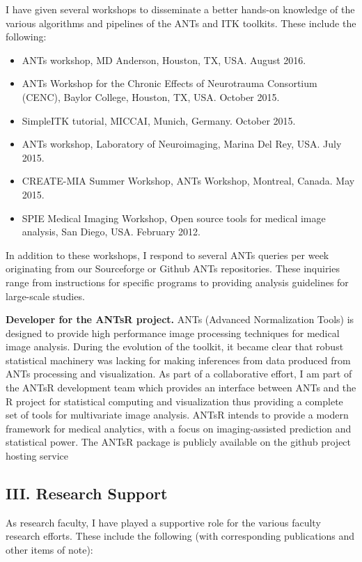 \documentclass[11pt,]{article}
\begin{document}
I have given several workshops to disseminate a better hands-on
knowledge of the various algorithms and pipelines of the ANTs and ITK
toolkits. These include the following:

\begin{itemize}
\item
  ANTs workshop, MD Anderson, Houston, TX, USA. August 2016.
\item
  ANTs Workshop for the Chronic Effects of Neurotrauma Consortium
  (CENC), Baylor College, Houston, TX, USA. October 2015.
\item
  SimpleITK tutorial, MICCAI, Munich, Germany. October 2015.
\item
  ANTs workshop, Laboratory of Neuroimaging, Marina Del Rey, USA. July
  2015.
\item
  CREATE-MIA Summer Workshop, ANTs Workshop, Montreal, Canada. May 2015.
\item
  SPIE Medical Imaging Workshop, Open source tools for medical image
  analysis, San Diego, USA. February 2012.
\end{itemize}

In addition to these workshops, I respond to several ANTs queries per
week originating from our Sourceforge or Github ANTs repositories. These
inquiries range from instructions for specific programs to providing
analysis guidelines for large-scale studies.

\textbf{Developer for the ANTsR project.} ANTs (Advanced Normalization
Tools) is designed to provide high performance image processing
techniques for medical image analysis. During the evolution of the
toolkit, it became clear that robust statistical machinery was lacking
for making inferences from data produced from ANTs processing and
visualization. As part of a collaborative effort, I am part of the ANTsR
development team which provides an interface between ANTs and the R
project for statistical computing and visualization thus providing a
complete set of tools for multivariate image analysis. ANTsR intends to
provide a modern framework for medical analytics, with a focus on
imaging-assisted prediction and statistical power. The ANTsR package is
publicly available on the github project hosting service

\subsection{III. Research Support}\label{iii.-research-support}

As research faculty, I have played a supportive role for the various
faculty research efforts. These include the following (with
corresponding publications and other items of note):
\end{document}
